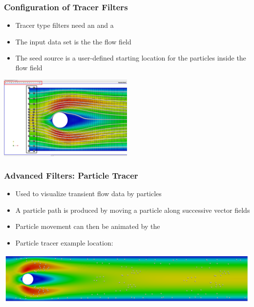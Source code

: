 \begin{frame}

  \frametitle{Configuration of Tracer Filters}

    \begin{itemize}
      \item Tracer type filters need an  and a 
      \item The input data set is the the flow field  
      \item The seed source is a user-defined starting location for the particles inside the flow field  
    \end{itemize}
    \includegraphics[width=0.5\textwidth]{screenshots/tracer-source.png}

\end{frame}

\begin{frame}

  \frametitle{Advanced Filters: Particle Tracer}

    \begin{itemize}
      \item Used to visualize transient flow data by particles 
      \item A particle path is produced by moving a particle along successive vector fields 
      \item Particle movement can then be animated by the  
      \item Particle tracer example location: 
    \end{itemize}
    \includegraphics[width=\textwidth]{screenshots/particle-tracer.png}

\end{frame}

